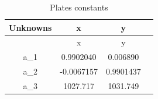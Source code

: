 \documentclass[letterpaper,12pt]{article}
\begin{document}
\FloatBarrier
\begin{table}[h!]
\caption{Plates constants} %
\centering %
\begin{tabular}{c c c c } %
\hline\hline %
Unknowns & x & y \\ [0.5ex] %
\hline %
         & x  & y\\ %
a_{1} &   0.9902040  & 0.006890  \\
a_{2} &  -0.0067157  & 0.9901437 \\
a_{3} &  1027.717     & 1031.749\\[1ex] %
\hline %
\end{tabular}
\label{table:nonlin} %
\end{table}
\FloatBarrier








\end{document}
